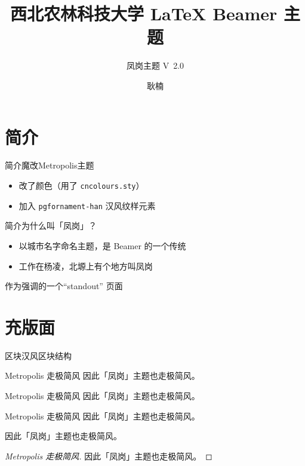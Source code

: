 \documentclass[fontset = none, t, aspectratio=169]{ctexbeamer}
\title[凤岗主题]{\Large 西北农林科技大学 {\LaTeX}  Beamer 主题}
\subtitle{凤岗主题 V\ 2.0}
\author[N. Geng]{耿楠}
\date{\tosemester} %
\institute[智能媒体]{智能媒体实验室}
\begin{document}
\begin{frame}[plain]
  \maketitle
\end{frame}

\section{简介}

\begin{frame}{简介}{魔改Metropolis主题}
  \begin{itemize}
    \item 改了颜色（用了 \texttt{cncolours.sty}）
    \item 加入 \texttt{pgfornament-han} 汉风纹样元素
  \end{itemize}
\end{frame}

\begin{frame}{简介}{为什么叫「凤岗」？}
  \begin{itemize}
    \item 以城市名字命名主题，是 Beamer 的一个传统
    \item 工作在杨凌，北塬上有个地方叫\alert{凤岗}
  \end{itemize}
\end{frame}

\begin{frame}
作为强调的一个\enquote{standout} 页面
\end{frame}

\section{充版面}

\begin{frame}[allowframebreaks]{区块}{汉风区块结构}

  \begin{block}{Metropolis 走极简风}
    因此「凤岗」主题也走极简风。
  \end{block}

  \begin{exampleblock}{Metropolis 走极简风}
    因此「凤岗」主题也走极简风。
  \end{exampleblock}

  \begin{alertblock}{Metropolis 走极简风}
    因此「凤岗」主题也走极简风。
  \end{alertblock}

  \begin{theorem}
    因此「凤岗」主题也走极简风。
  \end{theorem}

  \begin{proof}[Metropolis 走极简风]
    因此「凤岗」主题也走极简风。
  \end{proof}
\end{frame}
\end{document}
